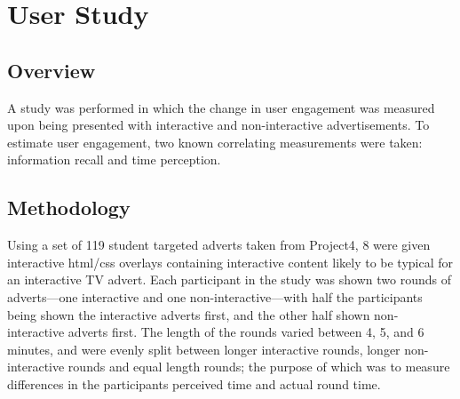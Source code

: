 \section{User Study}
	\subsection{Overview}
	A study was performed in which the change in user engagement was measured upon being presented with interactive and non-interactive advertisements. To estimate user engagement, two known correlating measurements were taken: information recall\citep{} and time perception\citep{yahoo-intrusive-advertising}.

	\subsection{Methodology}
	Using a set of 119 student targeted adverts taken from Project4, 8 were given interactive html/css overlays containing interactive content likely to be typical for an interactive TV advert. Each participant in the study was shown two rounds of adverts---one interactive and one non-interactive---with half the participants being shown the interactive adverts first, and the other half shown non-interactive adverts first. The length of the rounds varied between 4, 5, and 6 minutes, and were evenly split between longer interactive rounds, longer non-interactive rounds and equal length rounds; the purpose of which was to measure differences in the participants perceived time and actual round time. 

